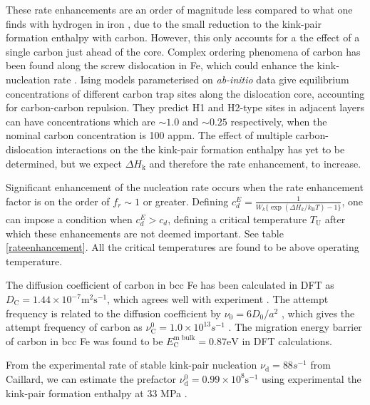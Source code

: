 \documentclass[a4paper,11pt]{article}
\begin{document}
These rate enhancements are an order of magnitude less compared to what one finds with
hydrogen in iron \cite{Simpson2019}, due to the small reduction to the kink-pair
formation enthalpy with carbon. However, this only accounts for a the effect of a
single carbon just ahead of the core. Complex ordering phenomena of carbon has been
found along the screw dislocation in Fe, which could enhance the kink-nucleation rate
\cite{Luthi2019}. Ising models parameterised on \emph{ab-initio} data give equilibrium
concentrations of different carbon trap sites along the dislocation core, accounting
for carbon-carbon repulsion. They predict H1 and H2-type sites in adjacent
layers can have concentrations which are \(\sim 1.0\) and \(\sim 0.25\) respectively, when
the nominal carbon concentration is 100 appm. The effect of multiple
carbon-dislocation interactions on the the kink-pair formation enthalpy has yet to be
determined, but we expect \(\Delta H_{\text{k}}\) and therefore the rate enhancement, to increase.

Significant enhancement of the nucleation rate occurs when the rate enhancement factor
is on the order of \(f_r \sim 1\) or greater. Defining \(c_d^E = \frac{1}{W_k \{\exp(
   \Delta H_{k}/k_{\text{B}}T ) - 1 \}}\), one can impose a condition when \(c_d^E > c_d\),
defining a critical temperature \(T_{\text{U}}\) after which these enhancements are not
deemed important. See table \ref{rateenhancement}. All the critical temperatures
are found to be above operating temperature.





The diffusion coefficient of carbon in bcc Fe has been calculated in DFT as
\(D_{\text{C}} = 1.44 \times10^{-7} \text{m}^2\text{s}^{-1}\), which agrees well with
experiment \cite{Jiang2003,daSilva1976}. The attempt frequency is related to the
diffusion coefficient by \(\nu_0 = 6D_0 / a^2\) \cite{Ramasubramaniam2008}, which gives
the attempt frequency of carbon as \(\nu_{\text{C}}^0 = 1.0 \times10^{13} s^{-1}\)
\cite{Nematollahi2016}. The migration energy barrier of carbon in bcc Fe was found to be
\(E^{\text{m bulk}}_{\text{C}} = 0.87 \text{eV}\) in DFT calculations.

From the experimental rate of stable kink-pair nucleation \(\nu_{\text{d}} = 88 s^{-1}\)
from Caillard, we can estimate the prefactor \(\nu_{\text{d}}^0 = 0.99 \times
   10^8\text{s}^{-1}\) using experimental the kink-pair formation enthalpy at 33 MPa
\cite{itakura13_effec_hydrog_atoms_screw_disloc}.
\end{document}
